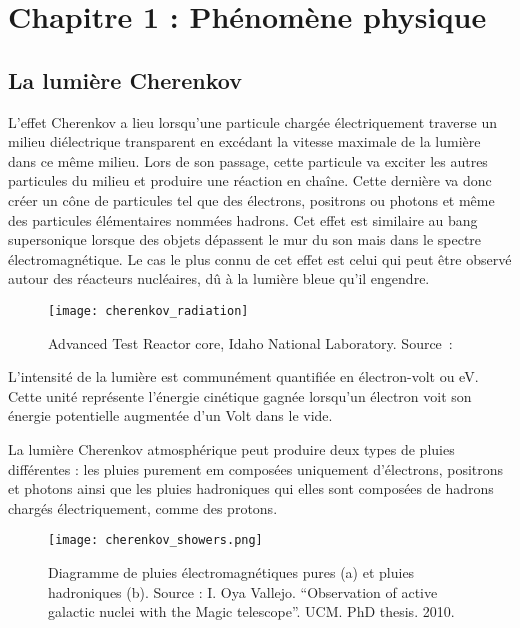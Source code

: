 \chapter{Chapitre 1 : Phénomène physique}


\section{La lumière Cherenkov}

L'effet Cherenkov a lieu lorsqu'une particule chargée électriquement traverse un milieu diélectrique transparent
en excédant la vitesse maximale de la lumière dans ce même milieu. 
Lors de son passage, cette particule va exciter les autres particules du milieu et produire une réaction en chaîne.
Cette dernière va donc créer un cône de particules tel que des électrons, positrons ou photons et même des particules élémentaires nommées hadrons.
Cet effet est similaire au bang supersonique lorsque des objets dépassent le mur du son mais dans le spectre électromagnétique.
Le cas le plus connu de cet effet est celui qui peut être observé autour des réacteurs nucléaires, dû à la lumière bleue qu'il engendre.

\begin{figure}[tbph!]
	\centering
	\texttt{[image: cherenkov\_radiation]}
	\caption[Advanced Test Reactor core, Idaho National Laboratory]{Advanced Test Reactor core, Idaho National Laboratory. Source : \cite{CherenkovRadiation}}
\end{figure}

L'intensité de la lumière est communément quantifiée en électron-volt ou eV.
Cette unité représente l'énergie cinétique gagnée lorsqu'un électron voit son énergie potentielle augmentée d'un Volt dans le vide.

La lumière Cherenkov atmosphérique peut produire deux types de pluies différentes : les pluies purement \gls{em}
composées uniquement d'électrons, positrons et photons ainsi que les pluies hadroniques qui elles sont composées de hadrons chargés électriquement, comme des protons.
\newpage
\begin{figure}[tbph!]
	\centering
	\texttt{[image: cherenkov\_showers.png]}
	\caption[Diagramme de pluies EM et hadroniques]{Diagramme de pluies électromagnétiques pures (a) et pluies hadroniques (b). Source : I. Oya Vallejo. “Observation of active galactic nuclei with the Magic telescope”. UCM. PhD thesis. 2010.}
\end{figure}

